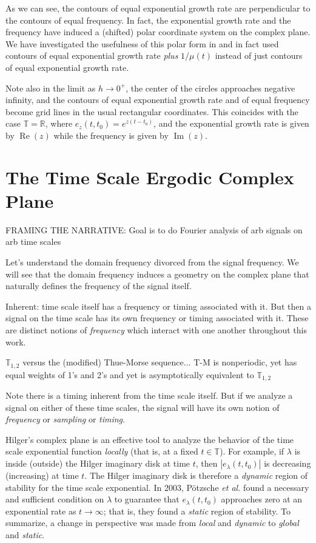 \documentclass[reqno]{amsart}
\theoremstyle{plain}
\theoremstyle{definition}
\numberwithin{theorem}{section}
\numberwithin{definition}{section}
\numberwithin{prop}{section}
\numberwithin{example}{section}
\newcommand{\T}{\ensuremath{\mathbb{T}}}
\DeclareMathOperator{\myRe}{Re}
\DeclareMathOperator{\myIm}{Im}
\renewcommand{\Re}{\myRe}
\renewcommand{\Im}{\myIm}
\begin{document}
As we can see, the contours of equal exponential growth rate are perpendicular to the contours of equal frequency. In fact, the exponential growth rate and the frequency have induced a (shifted) polar coordinate system on the complex plane. We have investigated the usefulness of this polar form in \cite{JaDaPo} and in fact used contours of equal exponential growth rate \emph{plus} $1/\mu(t)$ instead of just contours of equal exponential growth rate.

Note also in the limit as $h \rightarrow 0^{+}$, the center of the circles approaches negative infinity, and the contours of equal exponential growth rate and of equal frequency become grid lines in the usual rectangular coordinates. This coincides with the case $\mathbb{T}=\mathbb{R}$, where $e_{z}(t,t_0) = e^{z(t-t_0)}$, and the exponential growth rate is given by $\Re(z)$ while the frequency is given by $\Im(z)$.

\section{The Time Scale Ergodic Complex Plane}

FRAMING THE NARRATIVE: Goal is to do Fourier analysis of arb signals on arb time scales

Let's understand the domain frequency divorced from the signal frequency. We will see that the domain frequency induces a geometry on the complex plane that naturally defines the  frequency of the signal itself.

Inherent: time scale itself has a frequency or timing associated with it. But then a signal on the time scale has its own frequency or timing associated with it. These are distinct notions of {\it frequency} which interact with one another throughout this work.

$\T_{1,2}$ versus the (modified) Thue-Morse sequence... T-M is nonperiodic, yet has equal weights of 1's and 2's and yet is asymptotically equivalent to $\T_{1,2}$

Note there is a timing inherent from the time scale itself. But if we analyze a signal on either of these time scales, the signal will have its own notion of {\it frequency} or {\it sampling} or {\it timing}.





Hilger's complex plane is an effective tool to analyze the behavior of the time scale exponential function {\em locally} (that is, at a fixed $t \in \mathbb{T}$). For example, if $\lambda$ is inside (outside) the Hilger imaginary disk at time $t$, then $|e_{\lambda}(t,t_0)|$ is decreasing (increasing) at time $t$. The Hilger imaginary disk is therefore a {\em dynamic} region of stability for the time scale exponential. In 2003, P\"{o}tzsche {\it et al.} \cite{PoSiWi} found a necessary and sufficient condition on $\lambda$ to guarantee that $e_{\lambda}(t,t_0)$ approaches zero at an exponential rate as $t\to \infty$; that is, they found a {\em static} region of stability. To summarize, a change in perspective was made from {\em local} and {\em dynamic} to {\em global} and {\em static}. 
\end{document}
